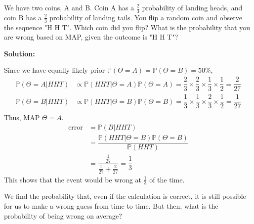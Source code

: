 \begin{eg}
  We have two coins, A and B. Coin A has a \(\frac{2}{3}\) probability of landing heads, and coin B has a \(\frac{2}{3}\) probability of landing tails. You flip a random coin and observe the sequence "H H T". Which coin did you flip? What is the probability that you are wrong based on MAP, given the outcome is "H H T"? 

  \textbf{Solution:} 

  Since we have equally likely prior \(\mathbb{P}(\Theta = A) = \mathbb{P}(\Theta = B) = 50\%\), 
  \[
    \begin{aligned}
      \mathbb{P}(\Theta = A \vert HHT) &\propto \mathbb{P}(HHT \vert \Theta = A)\mathbb{P}(\Theta = A) = \dfrac{2}{3} \times \dfrac{2}{3} \times \dfrac{1}{3} \times \dfrac{1}{2} = \dfrac{2}{27} \\
      \mathbb{P}(\Theta = B \vert HHT) &\propto \mathbb{P}(HHT \vert \Theta = B)\mathbb{P}(\Theta = B) = \dfrac{1}{3} \times \dfrac{1}{3} \times \dfrac{2}{3} \times \dfrac{1}{2} = \dfrac{1}{27} \\
    \end{aligned}
  \]
  Thus, MAP \(\Theta = A\). 
  \[
    \begin{aligned}
      \text{error} &= \mathbb{P}(B \vert HHT) \\
      &= \dfrac{\mathbb{P}(HHT \vert \Theta = B) \mathbb{P}(\Theta = B)}{\mathbb{P}(HHT)} \\
      &= \dfrac{\frac{1}{27}}{\frac{1}{27} + \frac{2}{27}} = \dfrac{1}{3}
    \end{aligned}
  \]
  This shows that the event would be wrong at \(\frac{1}{3}\) of the time. 
\end{eg}

We find the probability that, even if the calculation is correct, it is still possible for us to make a wrong guess from time to time. But then, what is the probability of being wrong on average? 

